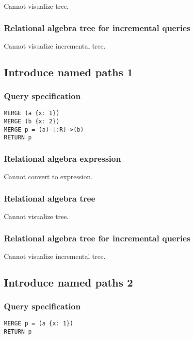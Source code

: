 Cannot visualize tree.

\subsubsection*{Relational algebra tree for incremental queries}

Cannot visualize incremental tree.

\subsection{Introduce named paths 1}

\subsubsection*{Query specification}

\begin{lstlisting}
MERGE (a {x: 1})
MERGE (b {x: 2})
MERGE p = (a)-[:R]->(b)
RETURN p
\end{lstlisting}

\subsubsection*{Relational algebra expression}

Cannot convert to expression.

\subsubsection*{Relational algebra tree}

Cannot visualize tree.

\subsubsection*{Relational algebra tree for incremental queries}

Cannot visualize incremental tree.

\subsection{Introduce named paths 2}

\subsubsection*{Query specification}

\begin{lstlisting}
MERGE p = (a {x: 1})
RETURN p
\end{lstlisting}

